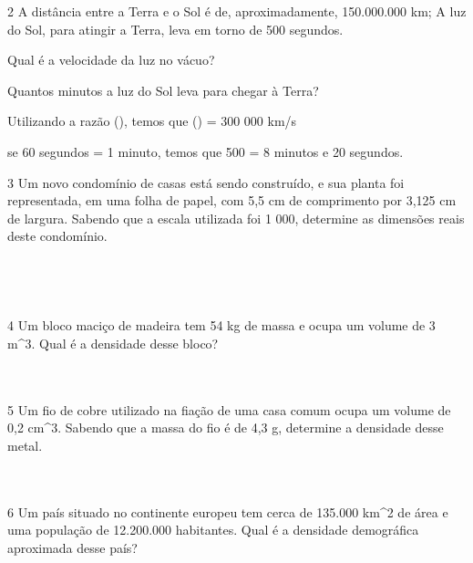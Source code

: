 \num{2} A distância entre a Terra e o Sol é de, aproximadamente, 150.000.000
km; A luz do Sol, para atingir a Terra, leva em torno de 500 segundos.
\item Qual é a velocidade da luz no vácuo?
\item Quantos minutos a luz do Sol leva para chegar à Terra?
\item Utilizando a razão (), temos que
() = 300 000 km/s
\item se 60 segundos = 1 minuto, temos que 500  = 8 minutos e 20
segundos.

\num{3} Um novo condomínio de casas está sendo construído, e sua planta foi
representada, em uma folha de papel, com 5,5 cm de comprimento por 3,125
cm de largura. Sabendo que a escala utilizada foi 1  000, determine
as dimensões reais deste condomínio.
\\
\\
\\
\\
\\

\num{4} Um bloco maciço de madeira tem 54 kg de massa e ocupa um volume de 3
m^3. Qual é a densidade desse bloco?

\\
\\

\num{5} Um fio de cobre utilizado na fiação de uma casa comum ocupa um volume
de 0,2 cm^3. Sabendo que a massa do fio é de 4,3 g, determine a densidade
desse metal.

\\
\\

\num{6} Um país situado no continente europeu tem cerca de 135.000 km^2 de
área e uma população de 12.200.000 habitantes. Qual é a densidade
demográfica aproximada desse país?

\\
\\
\\
\\

